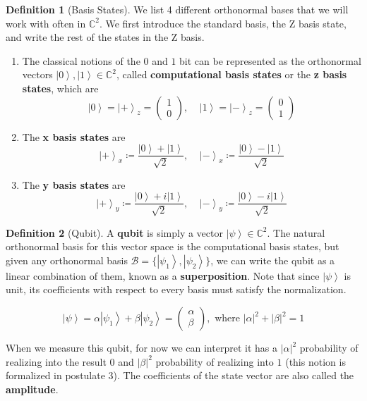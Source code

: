 \documentclass{article}
\newcommand{\ket}[1]{\ensuremath{\left|#1\right\rangle}}
\theoremstyle{definition}
\newtheorem{definition}{Definition}[section]
\begin{document}
    \begin{definition}[Basis States]
      We list 4 different orthonormal bases that we will work with often in $\mathbb{C}^2$. We first introduce the standard basis, the Z basis state, and write the rest of the states in the Z basis. 

      \begin{enumerate}
        \item The classical notions of the $0$ and $1$ bit can be represented as the orthonormal vectors $\ket{0}, \ket{1} \in \mathbb{C}^2$, called \textbf{computational basis states} or the \textbf{z basis states}, which are
          \[\ket{0} = \ket{+}_z = \begin{pmatrix} 1 \\ 0 \end{pmatrix}, \;\;\;\; \ket{1} = \ket{-}_z = \begin{pmatrix} 0 \\ 1 \end{pmatrix}\]  

        \item The \textbf{x basis states} are 
          \begin{equation}
            \ket{+}_x \coloneqq \frac{\ket{0} + \ket{1}}{\sqrt{2}} , \;\;\;\; \ket{-}_x \coloneqq \frac{\ket{0} - \ket{1}}{\sqrt{2}} 
            \label{eq:x_basis}
          \end{equation}
        
        \item The \textbf{y basis states} are 
          \begin{equation}
            \ket{+}_y \coloneqq \frac{\ket{0} + i \ket{1}}{\sqrt{2}} , \;\;\;\; \ket{-}_y \coloneqq \frac{\ket{0} - i \ket{1}}{\sqrt{2}} 
            \label{eq:y_basis}
          \end{equation}
      \end{enumerate}      
    \end{definition}


    \begin{definition}[Qubit]
      A \textbf{qubit} is simply a vector $\ket{\psi} \in \mathbb{C}^2$. The natural orthonormal basis for this vector space is the computational basis states, but given any orthonormal basis $\mathcal{B} = \{\ket{\psi_1} , \ket{\psi_2}\}$, we can write the qubit as a linear combination of them, known as a \textbf{superposition}. Note that since $\ket{\psi}$ is unit, its coefficients with respect to every basis must satisfy the normalization.  

        \[\ket{\psi} = \alpha \ket{\psi_1} + \beta \ket{\psi_2} = \begin{pmatrix} \alpha \\ \beta \end{pmatrix}, \text{ where } |\alpha|^2 + |\beta|^2 = 1\]

      When we measure this qubit, for now we can interpret it has a $|\alpha|^2$ probability of realizing into the result $0$ and $|\beta|^2$ probability of realizing into $1$ (this notion is formalized in postulate 3). The coefficients of the state vector are also called the \textbf{amplitude}. 
    \end{definition} 
\end{document}
